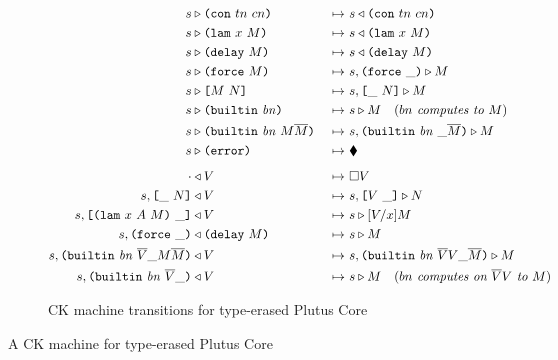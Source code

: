 \documentclass[../plutus-core-specification.tex]{subfiles}
\begin{document}
\begin{figure}[H]
\ContinuedFloat
  \begin{subfigure}[c]{\linewidth}

    \begin{minipage}{\linewidth}
\begin{alignat*}{2}
  s & \compute \con{tn}{cn}                      &~\mapsto~& s \return \con{tn}{cn}\\
  s & \compute \lamU{x}{M}                       &~\mapsto~& s \return \lamU{x}{M}\\
  s & \compute \delay{M}                         &~\mapsto~& s \return \delay{M}\\
  s & \compute \force{M}                         &~\mapsto~& s,\inForceFrame{} \compute M \\
  s & \compute \appU{M}{N}                       &~\mapsto~& s,\inAppLeftFrame{N} \compute M\\
  s & \compute \builtinU{bn}{\!\!}               &~\mapsto~& s \compute M
                                                 \quad (\textit{$bn$ computes to $M$}) \\
  s & \compute \builtinU{bn}{M \repetition{M}}   &~\mapsto~& s,\inBuiltinU{bn}{}{\_}{\repetition{M}} \compute M\\
  s & \compute \errorU                           &~\mapsto~& \ckerror{}\\
  \\[-10pt] %
  \cdot & \return V                              &~\mapsto~& \square V\\
  s,\inAppLeftFrame{N} & \return V               &~\mapsto~& s,\inAppRightFrame{V} \compute N\\
  s,\inAppRightFrame{\lam{x}{A}{M}} & \return V  &~\mapsto~& s \compute \subst{V}{x}{M}\\
  s,\inForceFrame{} & \return \delay{M}          &~\mapsto~& s \compute M\\
  s,\inBuiltinU{bn}{\repetition{V}}{\_}{M \repetition{M}} & \return V
                                                 &~\mapsto~& s,\inBuiltinU{bn}{\repetition{V} V}{\_}{\repetition{M}}
                                                 \compute M\\
  s,\inBuiltinU{bn}{\repetition{V}}{\_}{} & \return V
                                                 &~\mapsto~&  s \compute M
                                                 \quad (\textit{$bn$ computes on $\repetition{V}V$ to $M$})\\
    \end{alignat*}
\end{minipage}
    \caption{CK machine transitions for type-erased Plutus Core}
    \label{fig:untyped-ck-transitions}
\end{subfigure}
\caption{A CK machine for type-erased Plutus Core}
\label{fig:untyped-ck-machine}
\end{figure}
\end{document}

